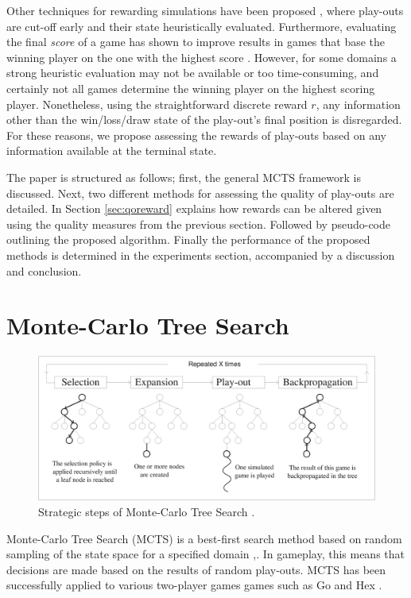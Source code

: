 \documentclass{ecai2010}
\begin{document}
Other techniques for rewarding simulations have been proposed \cite{Winands2010a}, where play-outs are cut-off early and their state heuristically evaluated. Furthermore, evaluating the final \emph{score} of a game has shown to improve results in games that base the winning player on the one with the highest score \cite{shibahara2008combining}. However, for some domains a strong heuristic evaluation may not be available or too time-consuming, and certainly not all games determine the winning player on the highest scoring player. Nonetheless, using the straightforward discrete reward $r$, any information other than the win/loss/draw state of the play-out's final position is disregarded. For these reasons, we propose assessing the rewards of play-outs based on any information available at the terminal state.

The paper is structured as follows; first, the general MCTS framework is discussed. Next, two different methods for assessing the quality of play-outs are detailed. In Section \ref{sec:qoreward} explains how rewards can be altered given using the quality measures from the previous section. Followed by pseudo-code outlining the proposed algorithm. Finally the performance of the proposed methods is determined in the experiments section, accompanied by a discussion and conclusion.

\section{Monte-Carlo Tree Search}
\label{sec:mcts}
\begin{figure}[ht]
	\centering
	\includegraphics[width=.45\textwidth]{img/figure1.eps}
	\caption{Strategic steps of Monte-Carlo Tree Search \cite{chaslot2008progressive}.}
	\label{fig:mcts-algorithm}
\end{figure}
Monte-Carlo Tree Search (MCTS) is a best-first search method based on random sampling of the state space for a specified domain \cite{kocsis2006bandit},\cite{coulom2007efficient}. In gameplay, this means that decisions are made based on the results of random play-outs. MCTS has been successfully applied to various two-player games games such as Go \cite{lee2010current} and Hex \cite{arneson2010monte}.
\end{document}

